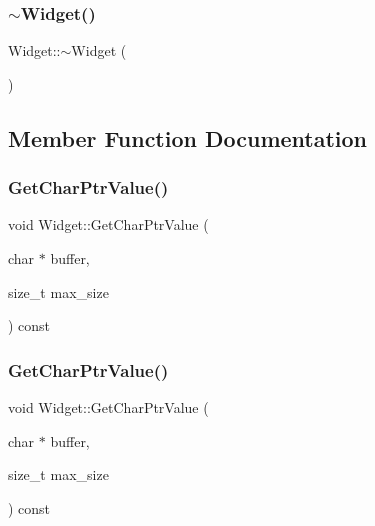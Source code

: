 \mbox{\label{class_widget_aa24f66bcbaaec6d458b0980e8c8eae65}} 
\subsubsection{\texorpdfstring{$\sim$Widget()}{~Widget()}\hspace{0.1cm}{\footnotesize\ttfamily [3/3]}}
{\footnotesize\ttfamily Widget\+::$\sim$\+Widget (\begin{DoxyParamCaption}{ }\end{DoxyParamCaption})}



\subsection{Member Function Documentation}
\mbox{\label{class_widget_a50791a556979f22f5593383143c7f815}} 
\subsubsection{\texorpdfstring{GetCharPtrValue()}{GetCharPtrValue()}\hspace{0.1cm}{\footnotesize\ttfamily [1/3]}}
{\footnotesize\ttfamily void Widget\+::\+Get\+Char\+Ptr\+Value (\begin{DoxyParamCaption}\item[{char $\ast$}]{buffer,  }\item[{size\+\_\+t}]{max\+\_\+size }\end{DoxyParamCaption}) const}

\mbox{\label{class_widget_a50791a556979f22f5593383143c7f815}} 
\subsubsection{\texorpdfstring{GetCharPtrValue()}{GetCharPtrValue()}\hspace{0.1cm}{\footnotesize\ttfamily [2/3]}}
{\footnotesize\ttfamily void Widget\+::\+Get\+Char\+Ptr\+Value (\begin{DoxyParamCaption}\item[{char $\ast$}]{buffer,  }\item[{size\+\_\+t}]{max\+\_\+size }\end{DoxyParamCaption}) const}

